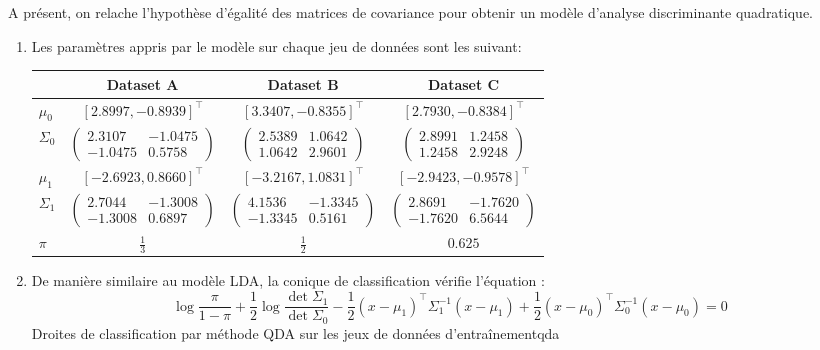 \documentclass{article}
\begin{document}

A présent, on relache l'hypothèse d'égalité des matrices de covariance pour obtenir un modèle d'analyse discriminante quadratique.

\begin{enumerate}[label=(\alph*)]
\item Les paramètres appris par le modèle sur chaque jeu de données sont les suivant:
\begin{center}
\begin{tabular}{|l|c|c|c|}
\hline
    & Dataset A & Dataset B & Dataset C\\
\hline
$\mu_0$ & $[2.8997, -0.8939]^\intercal$ & $[3.3407, -0.8355]^\intercal$& $[2.7930, -0.8384]^\intercal$\\
\hline
$\Sigma_0$ & $\begin{pmatrix}2.3107&-1.0475\\-1.0475&0.5758\end{pmatrix}$ & $\begin{pmatrix}2.5389&1.0642\\1.0642&2.9601\end{pmatrix}$ & $\begin{pmatrix}2.8991&1.2458\\1.2458&2.9248\end{pmatrix}$\\
\hline
$\mu_1$ & $[-2.6923,  0.8660]^\intercal$ & $[-3.2167, 1.0831]^\intercal$& $[-2.9423, -0.9578]^\intercal$\\
\hline
$\Sigma_1$ & $\begin{pmatrix}2.7044&-1.3008\\-1.3008&0.6897\end{pmatrix}$ & $\begin{pmatrix}4.1536&-1.3345\\-1.3345&0.5161\end{pmatrix}$ & $\begin{pmatrix}2.8691&-1.7620\\-1.7620&6.5644\end{pmatrix}$\\
\hline
$\pi$ & $\frac{1}{3}$ & $\frac{1}{2}$ & $0.625$\\
\hline
\end{tabular}
\end{center}

\item De manière similaire au modèle LDA, la conique de classification vérifie l'équation :
$$
\log \frac{\pi}{1 - \pi} + \frac{1}{2}\log\frac{\det \Sigma_1}{\det \Sigma_0} - \frac{1}{2}(x-\mu_1)^\intercal\Sigma_1^{-1}(x-\mu_1) + \frac{1}{2}(x-\mu_0)^\intercal\Sigma_0^{-1}(x-\mu_0) = 0
$$
          {}
          {}
          {Droites de classification par méthode QDA sur les jeux de données d'entraînement}{qda}


\end{enumerate}
\end{document}
